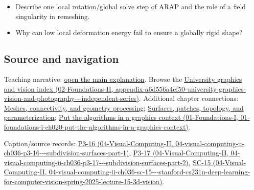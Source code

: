 \begin{itemize}
\tightlist
\item
  Describe one local rotation/global solve step of ARAP and the role of a field singularity in remeshing.
\item
  Why can low local deformation energy fail to ensure a globally rigid shape?
\end{itemize}

\subsection{Source and navigation}\label{appendix-7107009c505b-source-and-navigation}

Teaching narrative: \hyperref[03-visual-computing-i-ch002-meshes-connectivity-and-geometry-processing]{open the main explanation}. Browse the \href{../02-Foundations-II/main.pdf\#nameddest=appendix-a6d556a4ef50-university-graphics-vision-and-photography---independent-series}{University graphics and vision index (02-Foundations-II, appendix-a6d556a4ef50-university-graphics-vision-and-photography-\/-\/-independent-series)}. Additional chapter connections: \hyperref[03-visual-computing-i-ch002-meshes-connectivity-and-geometry-processing]{Meshes, connectivity, and geometry processing}; \hyperref[03-visual-computing-i-ch002-surfaces-patches-topology-and-parameterization]{Surfaces, patches, topology, and parameterization}; \href{../01-Foundations-I/main.pdf\#nameddest=01-foundations-i-ch020-put-the-algorithms-in-a-graphics-context}{Put the algorithms in a graphics context (01-Foundations-I, 01-foundations-i-ch020-put-the-algorithms-in-a-graphics-context)}.

Caption/source records: \href{../04-Visual-Computing-II/main.pdf\#nameddest=04-visual-computing-ii-ch036-p3-16---subdivision-surfaces-part-1}{P3-16 (04-Visual-Computing-II, 04-visual-computing-ii-ch036-p3-16-\/-\/-subdivision-surfaces-part-1)}, \href{../04-Visual-Computing-II/main.pdf\#nameddest=04-visual-computing-ii-ch036-p3-17---subdivision-surfaces-part-2}{P3-17 (04-Visual-Computing-II, 04-visual-computing-ii-ch036-p3-17-\/-\/-subdivision-surfaces-part-2)}, \href{../04-Visual-Computing-II/main.pdf\#nameddest=04-visual-computing-ii-ch036-sc-15---stanford-cs231n-deep-learning-for-computer-vision-spring-2025-lecture-15-3d-vision}{SC-15 (04-Visual-Computing-II, 04-visual-computing-ii-ch036-sc-15-\/-\/-stanford-cs231n-deep-learning-for-computer-vision-spring-2025-lecture-15-3d-vision)}.
